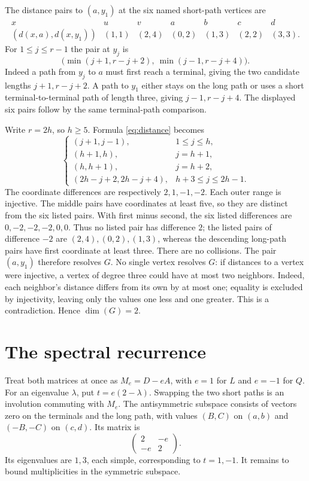 \documentclass[11pt]{article}
\begin{document}
The distance pairs to $(a,y_1)$ at the six named short-path vertices are
\[
\begin{array}{c|rrrrrr}
 x&u&v&a&b&c&d\\\hline
 (d(x,a),d(x,y_1))&(1,1)&(2,4)&(0,2)&(1,3)&(2,2)&(3,3).
\end{array}
\]
For $1\leq j\leq r-1$ the pair at $y_j$ is
\begin{equation}\label{eq:distance}
 \bigl(\min(j+1,r-j+2),\ \min(j-1,r-j+4)\bigr).
\end{equation}
Indeed a path from $y_j$ to $a$ must first reach a terminal, giving
the two candidate lengths $j+1,r-j+2$. A path to $y_1$ either stays
on the long path or uses a short terminal-to-terminal path of length
three, giving $j-1,r-j+4$.
The displayed six pairs follow by the same terminal-path comparison.

Write $r=2h$, so $h\geq5$. Formula \eqref{eq:distance} becomes
\[
\begin{cases}
 (j+1,j-1),&1\leq j\leq h,\\
 (h+1,h),&j=h+1,\\
 (h,h+1),&j=h+2,\\
 (2h-j+2,2h-j+4),&h+3\leq j\leq 2h-1.
\end{cases}
\]
The coordinate differences are respectively $2,1,-1,-2$.
Each outer range is injective. The middle pairs have coordinates at
least five, so they are distinct from the six listed pairs.
With first minus second, the six listed differences are
$0,-2,-2,-2,0,0$. Thus no listed pair has difference $2$; the listed pairs of difference
$-2$ are $(2,4),(0,2),(1,3)$, whereas the descending long-path pairs
have first coordinate at least three. There are no collisions.
The pair $(a,y_1)$ therefore resolves $G$.
No single vertex resolves $G$: if distances to a vertex were injective,
a vertex of degree three could have at most two neighbors. Indeed, each
neighbor's distance differs from its own by at most one; equality is
excluded by injectivity, leaving only the values one less and one greater.
This is a contradiction. Hence $\dim(G)=2$.

\section{The spectral recurrence}
Treat both matrices at once as $M_e=D-eA$, with $e=1$ for $L$ and
$e=-1$ for $Q$. For an eigenvalue $\lambda$, put $t=e(2-\lambda)$.
Swapping the two short paths is an involution commuting with $M_e$.
The antisymmetric subspace consists of vectors zero on the terminals
and the long path, with values $(B,C)$ on $(a,b)$ and $(-B,-C)$ on
$(c,d)$. Its matrix is
\[
 \begin{pmatrix}2&-e\\-e&2\end{pmatrix}.
\]
Its eigenvalues are $1,3$, each simple, corresponding to $t=1,-1$.
It remains to bound multiplicities in the symmetric subspace.
\end{document}
